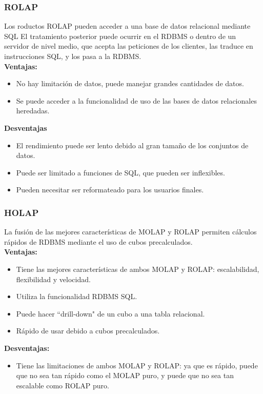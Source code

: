 \documentclass[DIV=calc, paper=a4, fontsize=11pt, twocolumn]{scrartcl}	 %
\begin{document}
\subsubsection*{ROLAP}
Los roductos ROLAP pueden acceder a una base de datos relacional mediante SQL El tratamiento posterior puede ocurrir en el RDBMS o dentro de un servidor de nivel medio, que acepta las peticiones de los clientes, las traduce en instrucciones SQL, y los pasa a la RDBMS.\\
\textbf{Ventajas:}
\begin{itemize}
\item No hay limitaci\'{o}n de datos, puede manejar grandes cantidades de datos.
\item Se puede acceder a la funcionalidad de uso de las bases de datos relacionales heredadas.
\end{itemize}
\textbf{Desventajas}
\begin{itemize}
\item El rendimiento puede ser lento debido al gran tama\~{n}o de los conjuntos de datos.
\item Puede ser limitado a funciones de SQL, que pueden ser inflexibles.
\item Pueden necesitar ser reformateado para los usuarios finales.
\end{itemize}

\subsubsection*{HOLAP}
La fusi\'{o}n de las mejores caracter\'{i}sticas de MOLAP y ROLAP permiten c\'{a}lculos r\'{a}pidos de RDBMS mediante el uso de cubos precalculados.\\
\textbf{Ventajas:}
\begin{itemize}
\item Tiene las mejores características de ambos MOLAP y ROLAP: escalabilidad, flexibilidad y velocidad.
\item Utiliza la funcionalidad RDBMS SQL.
\item Puede hacer ``drill-down" de un cubo a una tabla relacional.
\item R\'{a}pido de usar debido a cubos precalculados.
\end{itemize}
\textbf{Desventajas:}
\begin{itemize}
\item Tiene las limitaciones de ambos MOLAP y ROLAP: ya que es r\'{a}pido, puede que no sea tan r\'{a}pido como el MOLAP puro, y puede que no sea tan escalable como ROLAP puro.
\end{itemize}
\end{document}
